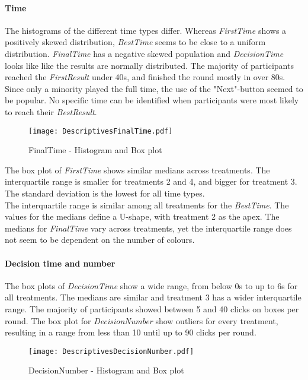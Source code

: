 \paragraph{Time}
\label{ch:Evaluation:sec:DescriptiveStatistics:subsec:Time}
The histograms of the different time types differ. Whereas \textit{FirstTime} shows a positively skewed distribution, \textit{BestTime} seems to be close to a uniform distribution. \textit{FinalTime} has a negative skewed population and \textit{DecisionTime} looks like like the results are normally distributed. The majority of participants reached the \textit{FirstResult} under 40s, and finished the round mostly in over 80s. Since only a minority played the full time, the use of the "Next"-button seemed to be popular. No specific time can be identified when participants were most likely to reach their \textit{BestResult}.\\
\begin{figure}[H] %
\begin{center} 
\texttt{[image: DescriptivesFinalTime.pdf]}
  \caption{FinalTime - Histogram and Box plot}
    \label{DistributionFinalTime} 
\end{center}
\end{figure}
The box plot of \textit{FirstTime} shows similar medians across treatments. The interquartile range is smaller for treatments 2 and 4, and bigger for treatment 3. The standard deviation is the lowest for all time types.\\
The interquartile range is similar among all treatments for the \textit{BestTime}. The values for the medians define a U-shape, with treatment 2 as the apex. The medians for \textit{FinalTime} vary across treatments, yet the interquartile range does not seem to be dependent on the number of colours.\\


\paragraph{Decision time and number}
The box plots of \textit{DecisionTime} show a wide range, from below 0s to up to 6s for all treatments. The medians are similar and treatment 3 has a wider interquartile range. The majority of participants showed between 5 and 40 clicks on boxes per round. The box plot for \textit{DecisionNumber} show outliers for every treatment, resulting in a range from less than 10 until up to 90 clicks per round.

\begin{figure}[htbp] %
\begin{center} 
\texttt{[image: DescriptivesDecisionNumber.pdf]}
  \caption{DecisionNumber - Histogram and Box plot}
    \label{DistributionDecisionNumber} 
\end{center}
\end{figure}

